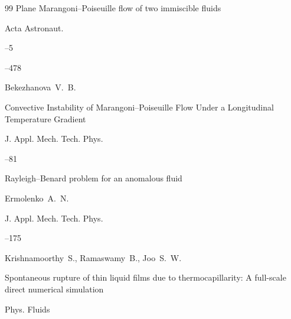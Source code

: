 \begin{thebibliography}{99}
\paper  Plane Marangoni--Poiseuille flow of two immiscible fluids 

\jour Acta Astronaut.



--5

--478







\by Bekezhanova~V.~B.

\paper Convective Instability of Marangoni--Poiseuille Flow Under a Longitudinal Temperature Gradient

\jour J. Appl. Mech. Tech. Phys.




–81








\paper Rayleigh--Benard problem for an anomalous fluid

\by Ermolenko~A.~N.

\jour J. Appl. Mech. Tech. Phys.




--175








\by Krishnamoorthy~S., Ramaswamy~B., Joo~S.~W.

\paper  Spontaneous rupture of thin liquid films due to thermocapillarity: A full-scale direct numerical simulation 

\jour Phys. Fluids





\end{thebibliography}
